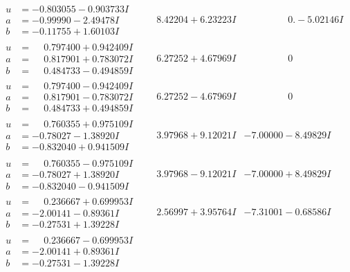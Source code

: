 \documentclass[1p]{elsarticle_modified}
\theoremstyle{definition}
\begin{document}
$$\begin{array}{c|c|c}
\begin{aligned}
u &= -0.803055 - 0.903733 I \\
a &= -0.99990 - 2.49478 I \\
b &= -0.11755 + 1.60103 I\end{aligned}
 & \phantom{-}8.42204 + 6.23223 I & \phantom{-0.000000 } 0. - 5.02146 I \\ \hline\begin{aligned}
u &= \phantom{-}0.797400 + 0.942409 I \\
a &= \phantom{-}0.817901 + 0.783072 I \\
b &= \phantom{-}0.484733 - 0.494859 I\end{aligned}
 & \phantom{-}6.27252 + 4.67969 I & \phantom{-0.000000 } 0 \\ \hline\begin{aligned}
u &= \phantom{-}0.797400 - 0.942409 I \\
a &= \phantom{-}0.817901 - 0.783072 I \\
b &= \phantom{-}0.484733 + 0.494859 I\end{aligned}
 & \phantom{-}6.27252 - 4.67969 I & \phantom{-0.000000 } 0 \\ \hline\begin{aligned}
u &= \phantom{-}0.760355 + 0.975109 I \\
a &= -0.78027 - 1.38920 I \\
b &= -0.832040 + 0.941509 I\end{aligned}
 & \phantom{-}3.97968 + 9.12021 I & -7.00000 - 8.49829 I \\ \hline\begin{aligned}
u &= \phantom{-}0.760355 - 0.975109 I \\
a &= -0.78027 + 1.38920 I \\
b &= -0.832040 - 0.941509 I\end{aligned}
 & \phantom{-}3.97968 - 9.12021 I & -7.00000 + 8.49829 I \\ \hline\begin{aligned}
u &= \phantom{-}0.236667 + 0.699953 I \\
a &= -2.00141 - 0.89361 I \\
b &= -0.27531 + 1.39228 I\end{aligned}
 & \phantom{-}2.56997 + 3.95764 I & -7.31001 - 0.68586 I \\ \hline\begin{aligned}
u &= \phantom{-}0.236667 - 0.699953 I \\
a &= -2.00141 + 0.89361 I \\
b &= -0.27531 - 1.39228 I\end{aligned}

\end{array}$$
\end{document}
